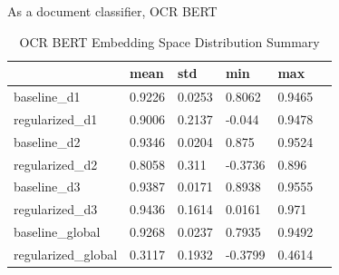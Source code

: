 \documentclass{article}
\begin{document}
As a document classifier, OCR BERT
\begin{table}[!ht]
    \centering
     \caption{OCR BERT Embedding Space Distribution Summary}
    \begin{tabular}{|l|l|l|l|l|l|}
    \hline
        ~ & mean & std & min & max \\ \hline
        baseline\_{d1}  & 0.9226 & 0.0253 & 0.8062 & 0.9465 \\ \hline
        regularized\_{d1} & 0.9006 & 0.2137 & -0.044 & 0.9478 \\ \hline
        baseline\_{d2} & 0.9346 & 0.0204 & 0.875 & 0.9524 \\ \hline
        regularized\_{d2} & 0.8058 & 0.311 & -0.3736 & 0.896 \\ \hline
        baseline\_{d3} & 0.9387 & 0.0171 & 0.8938 & 0.9555 \\ \hline
        regularized\_{d3} & 0.9436 & 0.1614 & 0.0161 & 0.971 \\ \hline
        baseline\_{global} & 0.9268 & 0.0237 & 0.7935 & 0.9492 \\ \hline
        regularized\_{global} & 0.3117 & 0.1932 & -0.3799 & 0.4614 \\ \hline
    \end{tabular}
\end{table}
\end{document}
